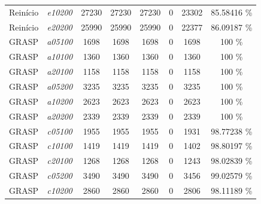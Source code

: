 \documentclass[portugues, brazil, a4paper,12pt]{article}
\begin{document}
{\begin{longtable}{cc|cccc|cc}
			Reinício           & \textit{e10200}  & 27230     & 27230          & 27230        & 0                      &   23302                         & 85.58416  \% \\
			Reinício           & \textit{e20200}  & 25990     & 25990          & 25990        & 0                      &   22377                         & 86.09187 \% \\ \hline
			GRASP              & \textit{a05100}  & 1698      & 1698           & 1698         & 0                      & 1698                            & 100                  \% \\
			GRASP              & \textit{a10100}  & 1360      & 1360           & 1360         & 0                      & 1360                            & 100                  \% \\
			GRASP              & \textit{a20100}  & 1158      & 1158           & 1158         & 0                      & 1158                            & 100                  \% \\
			GRASP              & \textit{a05200}  & 3235      & 3235           & 3235         & 0                      & 3235                            & 100                  \% \\
			GRASP              & \textit{a10200}  & 2623      & 2623           & 2623         & 0                      & 2623                            & 100                  \% \\
			GRASP              & \textit{a20200}  & 2339      & 2339           & 2339         & 0                      & 2339                            & 100                  \% \\
			GRASP              & \textit{c05100}  & 1955      & 1955           & 1955         & 0                      &  1931                           & 98.77238                       \% \\
			GRASP              & \textit{c10100}  & 1419      & 1419           & 1419         & 0                      &  1402                           & 98.80197                       \% \\
			GRASP              & \textit{c20100}  & 1268      & 1268           & 1268         & 0                      &  1243                           & 98.02839                       \% \\
			GRASP              & \textit{c05200}  & 3490      & 3490           & 3490         & 0                      &  3456                           & 99.02579                       \% \\
			GRASP              & \textit{c10200}  & 2860      & 2860           & 2860         & 0                      &  2806                           & 98.11189                       \% \\

\end{longtable}}
\end{document}
